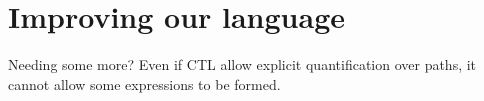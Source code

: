 \section{Improving our language}
\begin{frame}{Needing some more?}
    Even if CTL allow explicit quantification over paths, it cannot allow some expressions to be formed.
\end{frame}